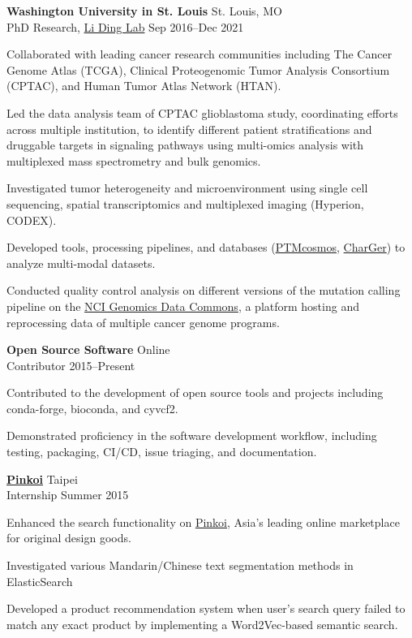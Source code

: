 \begin{entrylist}
\item \textbf{Washington University in St. Louis} \hfill St. Louis, MO\\
PhD Research, \href{https://dinglab.wustl.edu/}{Li Ding Lab} \hfill
Sep 2016--Dec 2021
\begin{detaillist}
    \item Collaborated with leading cancer research communities including The Cancer Genome Atlas (TCGA), Clinical Proteogenomic Tumor Analysis Consortium (CPTAC), and Human Tumor Atlas Network (HTAN).
    \item Led the data analysis team of CPTAC glioblastoma study, coordinating efforts across multiple institution, to identify different patient stratifications and druggable targets in signaling pathways using multi-omics analysis with multiplexed mass spectrometry and bulk genomics.
    \item Investigated tumor heterogeneity and microenvironment using single cell sequencing, spatial transcriptomics and multiplexed imaging (Hyperion, CODEX).
    \item Developed tools, processing pipelines, and databases (\href{https://ptmcosmos.wustl.edu/}{PTMcosmos}, \href{https://github.com/ding-lab/CharGer}{CharGer}) to analyze multi-modal datasets.
    \item Conducted quality control analysis on different versions of the mutation calling pipeline on the \href{https://gdc.cancer.gov/}{NCI Genomics Data Commons}, a platform hosting and reprocessing data of multiple cancer genome programs.
\end{detaillist}

\item \textbf{Open Source Software} \hfill Online\\
Contributor \hfill 2015--Present
\begin{detaillist}
    \item Contributed to the development of open source tools and projects including conda-forge, bioconda, and cyvcf2.
    \item Demonstrated proficiency in the software development workflow, including testing, packaging, CI/CD, issue triaging, and documentation.
\end{detaillist}

\item \href{http://pinkoi.com}{\textbf{Pinkoi}} \hfill Taipei\\
Internship \hfill
Summer 2015
\begin{detaillist}
    \item Enhanced the search functionality on \href{http://pinkoi.com}{Pinkoi}, Asia's leading online marketplace for original design goods.
    \item Investigated various Mandarin/Chinese text segmentation methods in ElasticSearch
    \item Developed a product recommendation system when user's search query failed to match any exact product by implementing a Word2Vec-based semantic search.
\end{detaillist}


\end{entrylist}
